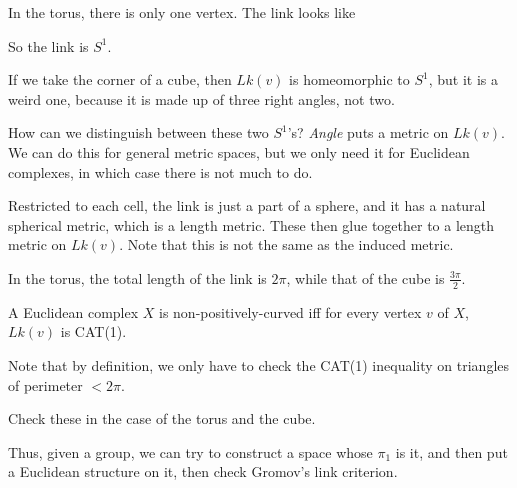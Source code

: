 \documentclass[a4paper]{article}
\begin{document}
\begin{eg}
  In the torus, there is only one vertex. The link looks like
  \begin{center}
  \end{center}
  So the link is $S^1$.
\end{eg}

\begin{eg}
  If we take the corner of a cube, then $Lk(v)$ is homeomorphic to $S^1$, but it is a weird one, because it is made up of three right angles, not two.
\end{eg}

How can we distinguish between these two $S^1$'s? \emph{Angle} puts a metric on $Lk(v)$. We can do this for general metric spaces, but we only need it for Euclidean complexes, in which case there is not much to do.

Restricted to each cell, the link is just a part of a sphere, and it has a natural spherical metric, which is a length metric. These then glue together to a length metric on $Lk(v)$. Note that this is not the same as the induced metric.

\begin{eg}
  In the torus, the total length of the link is $2\pi$, while that of the cube is $\frac{3\pi}{2}$.
\end{eg}

\begin{thm}
  A Euclidean complex $X$ is non-positively-curved iff for every vertex $v$ of $X$, $Lk(v)$ is CAT(1).
\end{thm}
Note that by definition, we only have to check the CAT(1) inequality on triangles of perimeter $< 2\pi$.

\begin{ex}
  Check these in the case of the torus and the cube.
\end{ex}

Thus, given a group, we can try to construct a space whose $\pi_1$ is it, and then put a Euclidean structure on it, then check Gromov's link criterion.
\end{document}
